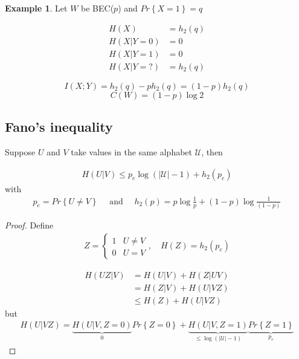 \documentclass[twoside]{article}
\theoremstyle{definition} %
\newtheorem{example}{Example}
\renewcommand{\Pr}[1]{Pr\left\{#1\right\}}
\def\U{\mathcal{U}}
\begin{document}
\begin{example}
  Let $W$ be BEC($p$) and $\Pr{X=1} = q$

  \begin{align*}
    H(X) &= h_2(q)
\\    H(X|Y=0) &= 0\\
    H(X|Y=1) &= 0\\
    H(X|Y=?) &= h_2(q)
  \end{align*}

  \[
    I(X;Y) = h_2(q) - ph_2(q) = (1-p)h_2(q)
  \]
  \[
    C(W) = (1-p)\log 2
  \]
\end{example}


\subsection{Fano's inequality}
Suppose $U$ and $V$ take values in the same alphabet $\U$, then

\begin{align*}
  H(U | V) \leq p_e \log(|\U| - 1) + h_2(p_e)
\end{align*}
with
\begin{align*}
  p_e = \Pr{U \neq V}
  \quad \text{ and } \quad
  h_2(p) = p \log \frac{1}{p} + (1 - p) \log \frac{1}{(1-p)}
\end{align*}

\begin{proof}
  Define
  \begin{align*}
    Z =
    \left\{
    \begin{array}{ll}
      1 & U \neq V \\
      0 & U = V
    \end{array}
    \right. , \quad
    H(Z) = h_2(p_e)
  \end{align*}

  \begin{align*}
    H(UZ | V) &= H(U|V) + H(Z | UV) \\
    &= H(Z | V) + H(U | VZ) \\
    &\leq H(Z) + H(U | VZ)
  \end{align*}
  but
  \begin{align*}
    H(U | VZ) = \underbrace{H(U | V, Z = 0)}_{0}\Pr{Z = 0} + \underbrace{H(U | V, Z = 1)}_{\leq \log(|\U| - 1)}\underbrace{\Pr{Z = 1}}_{p_e}
  \end{align*}
\end{proof}
\end{document}
